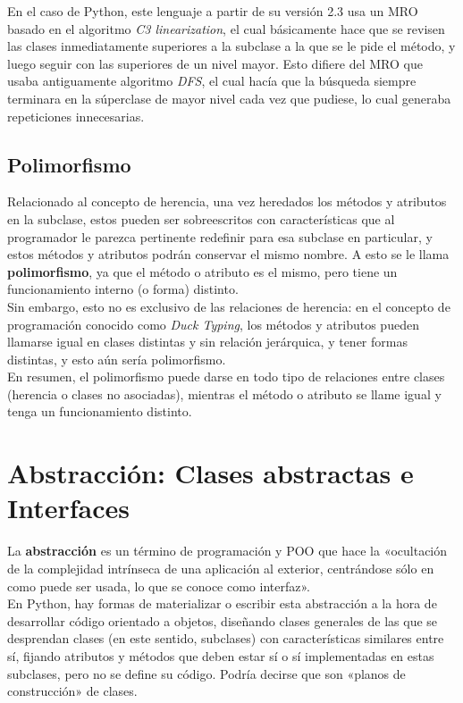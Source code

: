 \documentclass[11pt]{article}
\begin{document}
\noindent En el caso de Python, este lenguaje a partir de su versión 2.3 usa un MRO basado en el algoritmo \textit{C3 linearization}, el cual básicamente hace que se revisen las clases inmediatamente superiores a la subclase a la que se le pide el método, y luego seguir con las superiores de un nivel mayor. Esto difiere del MRO que usaba antiguamente algoritmo \textit{DFS}, el cual hacía que la búsqueda siempre terminara en la súperclase de mayor nivel cada vez que pudiese, lo cual generaba repeticiones innecesarias.


\subsection{Polimorfismo}
\noindent Relacionado al concepto de herencia, una vez heredados los métodos y atributos en la subclase, estos pueden ser sobreescritos con características que al programador le parezca pertinente redefinir para esa subclase en particular, y estos métodos y atributos podrán conservar el mismo nombre. A esto se le llama \textbf{polimorfismo}, ya que el método o atributo es el mismo, pero tiene un funcionamiento interno (o forma) distinto.\\

\noindent Sin embargo, esto no es exclusivo de las relaciones de herencia: en el concepto de programación conocido como \textit{Duck Typing}, los métodos y atributos pueden llamarse igual en clases distintas y sin relación jerárquica, y tener formas distintas, y esto aún sería polimorfismo.\\

\noindent En resumen, el polimorfismo puede darse en todo tipo de relaciones entre clases (herencia o clases no asociadas), mientras el método o atributo se llame igual y tenga un funcionamiento distinto.\\


\section{Abstracción: Clases abstractas e Interfaces}
La \textbf{abstracción} es un término de programación y POO que hace la «ocultación de la complejidad intrínseca de una aplicación al exterior, centrándose sólo en como puede ser usada, lo que se conoce como interfaz».\cite{libpython_abstraccion}\\

\noindent En Python, hay formas de materializar o escribir esta abstracción a la hora de desarrollar código orientado a objetos, diseñando clases generales de las que se desprendan clases (en este sentido, subclases) con características similares entre sí, fijando atributos y métodos que deben estar sí o sí implementadas en estas subclases, pero no se define su código. Podría decirse que son «planos de construcción» de clases.\\
\end{document}
